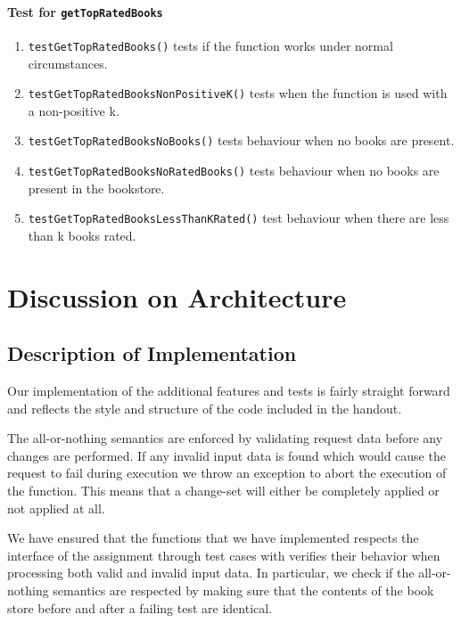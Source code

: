 \documentclass[11pt,a4paper,english]{article}
\begin{document}
\paragraph{Test for \texttt{getTopRatedBooks}}
\begin{enumerate}
\item{\texttt{testGetTopRatedBooks()} tests if the function works under normal circumstances.}
\item{\texttt{testGetTopRatedBooksNonPositiveK()} tests when the function is used with a non-positive k.}
\item{\texttt{testGetTopRatedBooksNoBooks()} tests behaviour when no books are present.}
\item{\texttt{testGetTopRatedBooksNoRatedBooks()} tests behaviour when no books are present in the bookstore.}
\item{\texttt{testGetTopRatedBooksLessThanKRated()} test behaviour when there are less than k books rated.}
\end{enumerate}

\section{Discussion on Architecture}
\subsection{Description of Implementation}
Our implementation of the additional features and tests is fairly straight
forward and reflects the style and structure of the code included in the
handout.

The all-or-nothing semantics are enforced by validating request data before any
changes are performed. If any invalid input data is found which would cause the
request to fail during execution we throw an exception to abort the execution of
the function. This means that a change-set will either be completely applied or
not applied at all.

We have ensured that the functions that we have implemented respects the
interface of the assignment through test cases with verifies their behavior when
processing both valid and invalid input data. In particular, we check if the
all-or-nothing semantics are respected by making sure that the contents of the
book store before and after a failing test are identical.
\end{document}
